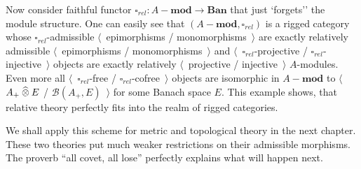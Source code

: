 Now consider faithful functor $\square_{rel}:A-\mathbf{mod}\to\mathbf{Ban}$ that
just `forgets'' the module structure. One can easily see that
$(A-\mathbf{mod},\square_{rel})$ is a rigged category whose
$\square_{rel}$-admissible $\langle$~epimorphisms / monomorphisms~$\rangle$ are
exactly relatively admissible $\langle$~epimorphisms / monomorphisms~$\rangle$
and $\langle$~$\square_{rel}$-projective / $\square_{rel}$-injective~$\rangle$
objects are exactly relatively $\langle$~projective / injective~$\rangle$
$A$-modules. Even more all $\langle$~$\square_{rel}$-free /
$\square_{rel}$-cofree~$\rangle$ objects are isomorphic in $A-\mathbf{mod}$ to
$\langle$~$A_+\mathbin{\widehat{\otimes}} E$ / $\mathcal{B}(A_+,E)$~$\rangle$ for some Banach
space $E$. This example shows, that relative theory perfectly fits into the
realm of rigged categories.

We shall apply this scheme for metric and topological theory in the next
chapter. These two theories put much weaker restrictions on their admissible
morphisms. The proverb ``all covet, all lose'' perfectly explains what will
happen next.
